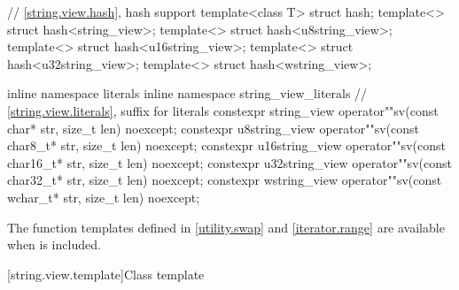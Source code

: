 \begin{codeblock}
{  // \ref{string.view.hash}, hash support
  template<class T> struct hash;
  template<> struct hash<string_view>;
  template<> struct hash<u8string_view>;
  template<> struct hash<u16string_view>;
  template<> struct hash<u32string_view>;
  template<> struct hash<wstring_view>;

  inline namespace literals {
  inline namespace string_view_literals {
    // \ref{string.view.literals}, suffix for  literals
    constexpr string_view    operator""sv(const char* str, size_t len) noexcept;
    constexpr u8string_view  operator""sv(const char8_t* str, size_t len) noexcept;
    constexpr u16string_view operator""sv(const char16_t* str, size_t len) noexcept;
    constexpr u32string_view operator""sv(const char32_t* str, size_t len) noexcept;
    constexpr wstring_view   operator""sv(const wchar_t* str, size_t len) noexcept;
  }
  }
}
\end{codeblock}

\pnum
The function templates defined in \ref{utility.swap} and \ref{iterator.range}
are available when  is included.

[string.view.template]{Class template }

